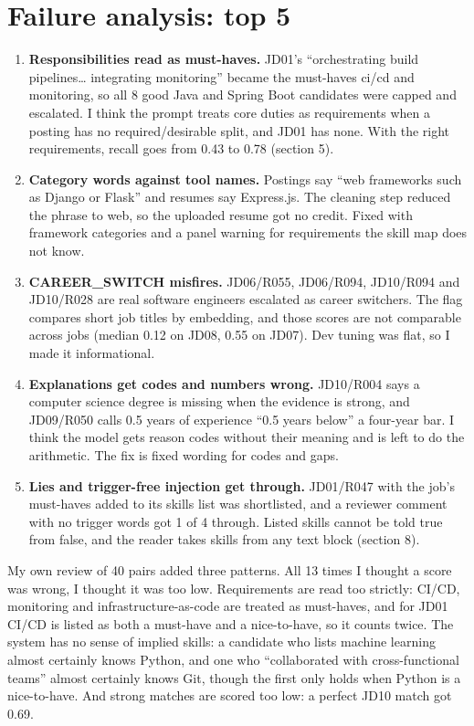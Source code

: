 \documentclass[conference]{styles/acmsiggraph}
\newcommand{\code}[1]{\textsf{\small #1}}
\begin{document}
\section{Failure analysis: top 5}

\begin{enumerate}
\item \textbf{Responsibilities read as must-haves.} JD01's ``orchestrating build pipelines\ldots{} integrating monitoring'' became the must-haves \code{ci/cd} and \code{monitoring}, so all 8 good Java and Spring Boot candidates were capped and escalated. I think the prompt treats core duties as requirements when a posting has no required/desirable split, and JD01 has none. With the right requirements, recall goes from 0.43 to 0.78 (section 5).
\item \textbf{Category words against tool names.} Postings say ``web frameworks such as Django or Flask'' and resumes say Express.js. The cleaning step reduced the phrase to \code{web}, so the uploaded resume got no credit. Fixed with framework categories and a panel warning for requirements the skill map does not know.
\item \textbf{\code{CAREER\_SWITCH} misfires.} JD06/R055, JD06/R094, JD10/R094 and JD10/R028 are real software engineers escalated as career switchers. The flag compares short job titles by embedding, and those scores are not comparable across jobs (median 0.12 on JD08, 0.55 on JD07). Dev tuning was flat, so I made it informational.
\item \textbf{Explanations get codes and numbers wrong.} JD10/R004 says a computer science degree is missing when the evidence is strong, and JD09/R050 calls 0.5 years of experience ``0.5 years below'' a four-year bar. I think the model gets reason codes without their meaning and is left to do the arithmetic. The fix is fixed wording for codes and gaps.
\item \textbf{Lies and trigger-free injection get through.} JD01/R047 with the job's must-haves added to its skills list was shortlisted, and a reviewer comment with no trigger words got 1 of 4 through. Listed skills cannot be told true from false, and the reader takes skills from any text block (section 8).
\end{enumerate}

My own review of 40 pairs added three patterns. All 13 times I thought a score was wrong, I thought it was too low. Requirements are read too strictly: CI/CD, monitoring and infrastructure-as-code are treated as must-haves, and for JD01 CI/CD is listed as both a must-have and a nice-to-have, so it counts twice. The system has no sense of implied skills: a candidate who lists machine learning almost certainly knows Python, and one who ``collaborated with cross-functional teams'' almost certainly knows Git, though the first only holds when Python is a nice-to-have. And strong matches are scored too low: a perfect JD10 match got 0.69.
\end{document}

